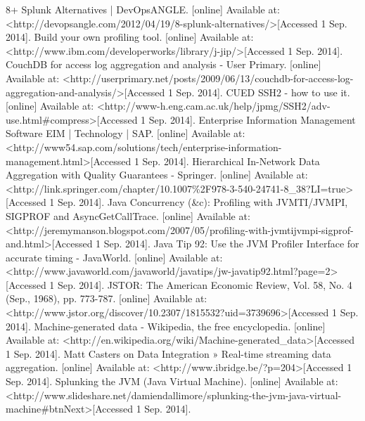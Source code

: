 \documentclass{llncs}
\begin{document}
\pagebreak
\begin{thebibliography}{}  %
8+ Splunk Alternatives | DevOpsANGLE. [online] Available at: \textless http://devopsangle.com/2012/04/19/8-splunk-alternatives/\textgreater [Accessed 1 Sep. 2014].
Build your own profiling tool. [online] Available at: \textless http://www.ibm.com/developerworks/library/j-jip/\textgreater [Accessed 1 Sep. 2014].
CouchDB for access log aggregation and analysis - User Primary. [online] Available at: \textless http://userprimary.net/posts/2009/06/13/couchdb-for-access-log-aggregation-and-analysis/\textgreater [Accessed 1 Sep. 2014].
CUED SSH2 - how to use it. [online] Available at: \textless http://www-h.eng.cam.ac.uk/help/jpmg/SSH2/adv-use.html\#compress\textgreater [Accessed 1 Sep. 2014].
Enterprise Information Management Software EIM | Technology | SAP. [online] Available at: \textless http://www54.sap.com/solutions/tech/enterprise-information-management.html\textgreater [Accessed 1 Sep. 2014].
Hierarchical In-Network Data Aggregation with Quality Guarantees - Springer. [online] Available at: \textless http://link.springer.com/chapter/10.1007\%2F978-3-540-24741-8\_38?LI=true\textgreater [Accessed 1 Sep. 2014].
Java Concurrency (\&c): Profiling with JVMTI/JVMPI, SIGPROF and AsyncGetCallTrace. [online] Available at: \textless http://jeremymanson.blogspot.com/2007/05/profiling-with-jvmtijvmpi-sigprof-and.html\textgreater [Accessed 1 Sep. 2014].
 Java Tip 92: Use the JVM Profiler Interface for accurate timing - JavaWorld. [online] Available at: \textless http://www.javaworld.com/javaworld/javatips/jw-javatip92.html?page=2\textgreater [Accessed 1 Sep. 2014].
JSTOR: The American Economic Review, Vol. 58, No. 4 (Sep., 1968), pp. 773-787. [online] Available at: \textless http://www.jstor.org/discover/10.2307/1815532?uid=3739696\textgreater [Accessed 1 Sep. 2014].
Machine-generated data - Wikipedia, the free encyclopedia. [online] Available at: \textless http://en.wikipedia.org/wiki/Machine-generated\_data\textgreater [Accessed 1 Sep. 2014].
 Matt Casters on Data Integration » Real-time streaming data aggregation. [online] Available at:
\textless http://www.ibridge.be/?p=204\textgreater [Accessed 1 Sep. 2014].
Splunking the JVM (Java Virtual Machine). [online] Available at: \textless http://www.slideshare.net/damiendallimore/splunking-the-jvm-java-virtual-machine\#btnNext\textgreater [Accessed 1 Sep. 2014].

\end{thebibliography}
\end{document}

